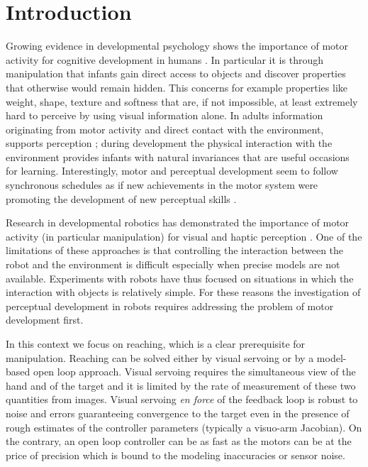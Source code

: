 \section{Introduction}
Growing evidence in developmental psychology shows the importance 
of motor activity for cognitive development in humans \cite{gallese06mirror}. 
In particular it is through manipulation that infants gain direct access 
to objects and discover properties that otherwise would remain hidden. 
This concerns for example properties like weight, shape, texture and 
softness that are, if not impossible, at least extremely hard to perceive 
by using visual information alone. In adults information originating 
from motor activity and direct contact with the environment, supports 
perception \cite{klatzky87hand}; during development
the physical interaction with the environment provides infants 
with natural invariances that are useful occasions for learning.
Interestingly, motor and perceptual development seem to follow synchronous  
schedules as if new achievements in the motor system were promoting
the development of new perceptual skills \cite{bushnell93motor}.

Research in developmental robotics has demonstrated the importance of
motor activity (in particular manipulation) for visual and haptic 
perception \cite{fitzpatrick07shared}. One of the 
limitations of these approaches is that controlling the interaction between
the robot and the environment is difficult especially when precise models are
not available. Experiments with robots have thus focused on situations
in which the interaction with objects is relatively simple. For these reasons
the investigation of perceptual development in robots requires addressing 
the problem of motor development first.

In this context we focus on reaching, which is a clear prerequisite for 
manipulation. Reaching can be solved either by visual servoing \cite{hutchinson96tutorial} 
or by a model-based open loop \cite{blackburn94learning,metta99developmental} approach. 
Visual servoing requires the simultaneous view of the hand and of the target
and it is limited by the rate of measurement of these two quantities from images. 
Visual servoing \emph{en force} of the feedback loop is robust to noise and errors 
guaranteeing convergence to the target even in the presence of rough estimates
of the controller parameters (typically a visuo-arm Jacobian). On the contrary,
an open loop controller can be as fast as the motors can be at the price of precision
which is bound to the modeling inaccuracies or sensor noise.

